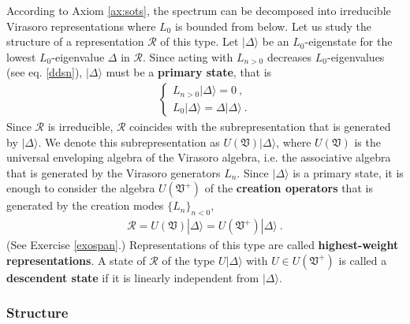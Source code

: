 \documentclass[12pt, a4paper, notitlepage, twoside]{report}
\numberwithin{equation}{section}
\theoremstyle{break}
\begin{document}
According to Axiom \ref{ax:sots}, the spectrum can be decomposed into irreducible Virasoro representations where $L_0$ is bounded from below. 
Let us study the structure of a representation $\mathcal{R}$ of this type. 
Let $|\Delta\rangle$ be an $L_0$-eigenstate for the lowest $L_0$-eigenvalue $\Delta$ in $\mathcal{R}$.
Since acting with $L_{n>0}$ decreases $L_0$-eigenvalues (see eq. \eqref{ddsn}), $|\Delta\rangle$ must be a \textbf{\boldmath primary state}, that is
\begin{align}
 \boxed{\left\{\begin{array}{l}  L_{n>0}|\Delta\rangle = 0\ , \\ L_0 |\Delta\rangle = \Delta |\Delta\rangle\ .\end{array}\right. }
\label{lvlv}
\end{align}
Since $\mathcal{R}$ is irreducible, $\mathcal{R}$ coincides with the subrepresentation that is generated by $|\Delta\rangle$. We denote this subrepresentation as $U(\mathfrak{V})|\Delta\rangle$, where $U(\mathfrak{V})$ is the universal enveloping algebra of the Virasoro algebra, i.e. the associative algebra that is generated by the Virasoro generators $L_n$.
Since $|\Delta\rangle$ is a primary state, it is enough to consider the algebra $U(\mathfrak{V}^+)$ of the \textbf{\boldmath creation operators} that is generated by the creation modes $\{L_n\}_{n<0}$, 
\begin{align}
 \mathcal{R} = U(\mathfrak{V})|\Delta\rangle =U(\mathfrak{V}^+)|\Delta\rangle\ .
\label{ruv}
\end{align}
(See Exercise \ref{exospan}.)
Representations of this type are called \textbf{\boldmath highest-weight representations}.
A state of $\mathcal{R}$ of the type $U|\Delta\rangle$ with $U\in U(\mathfrak{V}^+)$ is called a \textbf{\boldmath descendent state} if it is linearly independent from $|\Delta\rangle$.


\subsubsection{Structure}
\end{document}
